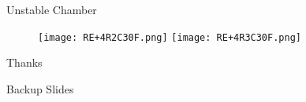\documentclass[slidestop,compress,mathserif]{beamer}
\begin{document}
\begin{frame} \begin{center} Unstable Chamber \end{center}
\begin{figure}
        \texttt{[image: RE+4R2C30F.png]}%
        \texttt{[image: RE+4R3C30F.png]}%
\end{figure}
\end{frame}
\label{lastslide}
\begin{frame}[c]
	\begin{center}
	\Huge Thanks
	\end{center}
\end{frame}

\begin{frame}[c]
	\begin{center}
	\Huge Backup Slides
	\end{center}
\end{frame}
\end{document}
